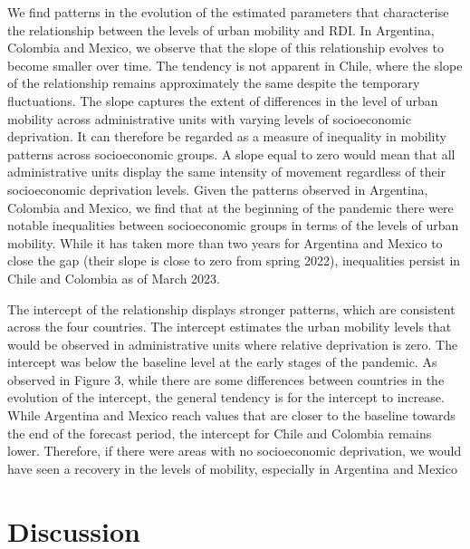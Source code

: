 \documentclass[
  11pt,
]{article}
\begin{document}
We find patterns in the evolution of the estimated parameters that
characterise the relationship between the levels of urban mobility and
RDI. In Argentina, Colombia and Mexico, we observe that the slope of
this relationship evolves to become smaller over time. The tendency is
not apparent in Chile, where the slope of the relationship remains
approximately the same despite the temporary fluctuations. The slope
captures the extent of differences in the level of urban mobility across
administrative units with varying levels of socioeconomic deprivation.
It can therefore be regarded as a measure of inequality in mobility
patterns across socioeconomic groups. A slope equal to zero would mean
that all administrative units display the same intensity of movement
regardless of their socioeconomic deprivation levels. Given the patterns
observed in Argentina, Colombia and Mexico, we find that at the
beginning of the pandemic there were notable inequalities between
socioeconomic groups in terms of the levels of urban mobility. While it
has taken more than two years for Argentina and Mexico to close the gap
(their slope is close to zero from spring 2022), inequalities persist in
Chile and Colombia as of March 2023.

The intercept of the relationship displays stronger patterns, which are
consistent across the four countries. The intercept estimates the urban
mobility levels that would be observed in administrative units where
relative deprivation is zero. The intercept was below the baseline level
at the early stages of the pandemic. As observed in Figure 3, while
there are some differences between countries in the evolution of the
intercept, the general tendency is for the intercept to increase. While
Argentina and Mexico reach values that are closer to the baseline
towards the end of the forecast period, the intercept for Chile and
Colombia remains lower. Therefore, if there were areas with no
socioeconomic deprivation, we would have seen a recovery in the levels
of mobility, especially in Argentina and Mexico

\hypertarget{sec-discussion}{%
\section{Discussion}\label{sec-discussion}}
\end{document}
